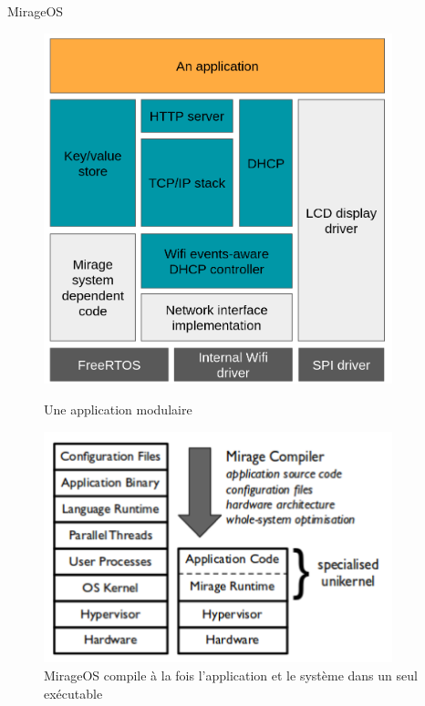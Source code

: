 
\begin{frame}{MirageOS}
    
\begin{figure}
    \centering
    \begin{minipage}{0.45\textwidth}
        \centering
        \includegraphics[width=0.9\textwidth]{slides/images/mirage.png}
        \caption{Une application modulaire}
    \end{minipage}\hfill
    \begin{minipage}{0.45\textwidth}
        \centering
        \includegraphics[width=0.9\textwidth]{slides/images/mirage2.png}
        \caption{MirageOS compile à la fois l'application et le système dans un seul exécutable}
    \end{minipage}
\end{figure}

\end{frame}

